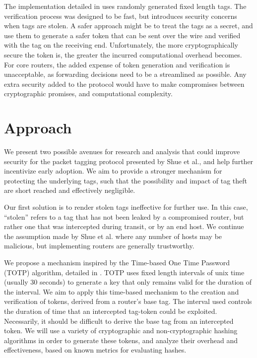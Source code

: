 \documentclass[12pt]{article} %
\begin{document}
	The implementation detailed in \cite{Shue20081567} uses randomly generated fixed length tags. The verification process was designed to be fast, but introduces security concerns when tags are stolen. A safer approach might be to treat the tags as a secret, and use them to generate a safer token that can be sent over the wire and verified with the tag on the receiving end. Unfortunately, the more cryptographically secure the token is, the greater the incurred computational overhead becomes. For core routers, the added expense of token generation and verification is unacceptable, as forwarding decisions need to be a streamlined as possible. Any extra security added to the protocol would have to make compromises between cryptographic promises, and computational complexity.

\section{Approach}
	We present two possible avenues for research and analysis that could improve security for the packet tagging protocol presented by Shue et al., and help further incentivize early adoption. We aim to provide a stronger mechanism for protecting the underlying tags, such that the possibility and impact of tag theft are short reached and effectively negligible.

	Our first solution is to render stolen tags ineffective for further use. In this case, ``stolen'' refers to a tag that has not been leaked by a compromised router, but rather one that was intercepted during transit, or by an end host. We continue the assumption made by Shue et al. where any number of hosts may be malicious, but implementing routers are generally trustworthy. 

	We propose a mechanism inspired by the Time-based One Time Password (TOTP) algorithm, detailed in \cite{rfc6238}. TOTP uses fixed length intervals of unix time (usually 30 seconds) to generate a key that only remains valid for the duration of the interval. We aim to apply this time-based mechanism to the creation and verification of tokens, derived from a router's base tag. The interval used controls the duration of time that an intercepted tag-token could be exploited. Necessarily, it should be difficult to derive the base tag from an intercepted token. We will use a variety of cryptographic and non-cryptographic hashing algorithms in order to generate these tokens, and analyze their overhead and effectiveness, based on known metrics for evaluating hashes.
\end{document}
